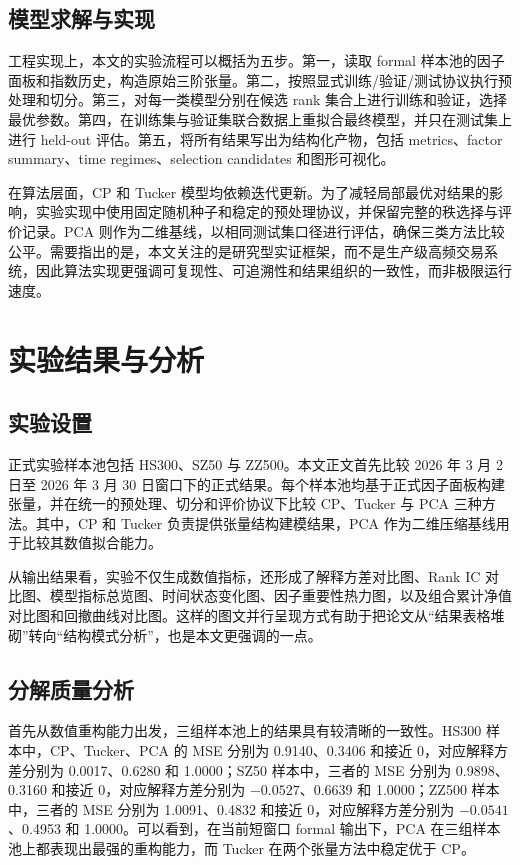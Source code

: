 \section{模型求解与实现}

工程实现上，本文的实验流程可以概括为五步。第一，读取 formal 样本池的因子面板和指数历史，构造原始三阶张量。第二，按照显式训练/验证/测试协议执行预处理和切分。第三，对每一类模型分别在候选 rank 集合上进行训练和验证，选择最优参数。第四，在训练集与验证集联合数据上重拟合最终模型，并只在测试集上进行 held-out 评估。第五，将所有结果写出为结构化产物，包括 metrics、factor summary、time regimes、selection candidates 和图形可视化。

在算法层面，CP 和 Tucker 模型均依赖迭代更新。为了减轻局部最优对结果的影响，实验实现中使用固定随机种子和稳定的预处理协议，并保留完整的秩选择与评价记录。PCA 则作为二维基线，以相同测试集口径进行评估，确保三类方法比较公平。需要指出的是，本文关注的是研究型实证框架，而不是生产级高频交易系统，因此算法实现更强调可复现性、可追溯性和结果组织的一致性，而非极限运行速度。

\chapter{实验结果与分析}

\section{实验设置}

正式实验样本池包括 HS300、SZ50 与 ZZ500。本文正文首先比较 2026 年 3 月 2 日至 2026 年 3 月 30 日窗口下的正式结果。每个样本池均基于正式因子面板构建张量，并在统一的预处理、切分和评价协议下比较 CP、Tucker 与 PCA 三种方法。其中，CP 和 Tucker 负责提供张量结构建模结果，PCA 作为二维压缩基线用于比较其数值拟合能力。

从输出结果看，实验不仅生成数值指标，还形成了解释方差对比图、Rank IC 对比图、模型指标总览图、时间状态变化图、因子重要性热力图，以及组合累计净值对比图和回撤曲线对比图。这样的图文并行呈现方式有助于把论文从“结果表格堆砌”转向“结构模式分析”，也是本文更强调的一点。

\section{分解质量分析}

首先从数值重构能力出发，三组样本池上的结果具有较清晰的一致性。HS300 样本中，CP、Tucker、PCA 的 MSE 分别为 0.9140、0.3406 和接近 0，对应解释方差分别为 0.0017、0.6280 和 1.0000；SZ50 样本中，三者的 MSE 分别为 0.9898、0.3160 和接近 0，对应解释方差分别为 $-0.0527$、0.6639 和 1.0000；ZZ500 样本中，三者的 MSE 分别为 1.0091、0.4832 和接近 0，对应解释方差分别为 $-0.0541$、0.4953 和 1.0000。可以看到，在当前短窗口 formal 输出下，PCA 在三组样本池上都表现出最强的重构能力，而 Tucker 在两个张量方法中稳定优于 CP。

